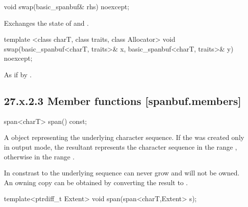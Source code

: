 \documentclass[ebook,11pt,article]{memoir}
\begin{document}
\begin{itemdecl}
void swap(basic_spanbuf& rhs) noexcept;
\end{itemdecl}

\begin{itemdescr}
\pnum
\effects Exchanges the state of 
and .
\end{itemdescr}

\begin{itemdecl}
template <class charT, class traits, class Allocator>
  void swap(basic_spanbuf<charT, traits>& x,
            basic_spanbuf<charT, traits>& y) noexcept;
\end{itemdecl}

\begin{itemdescr}
\pnum
\effects As if by .
\end{itemdescr}


\subsection{27.x.2.3 Member functions [spanbuf.members]}

\begin{itemdecl}
span<charT> span() const;
\end{itemdecl}

\begin{itemdescr}
\pnum
\returns
A
object representing the  
underlying character sequence.
If the  was created only in output mode, the resultant
 represents the character sequence in the range
, otherwise in the range
. 
\begin{note}
In constrast to  the underlying sequence can never grow and will not be owned. An owning copy can be obtained by converting the result to .
\end{note}


\end{itemdescr}

\begin{itemdecl}
template<ptrdiff_t Extent>
void span(span<charT,Extent> s);
\end{itemdecl}
\end{document}
